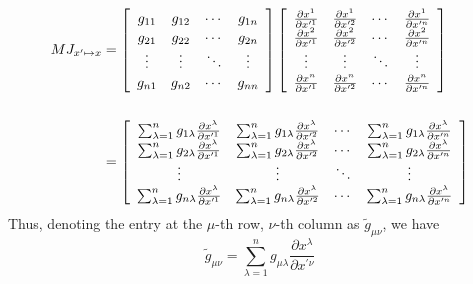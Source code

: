\documentclass{article}
\begin{document}
\begin{align*}
M J_{x' \mapsto x} &=
\left[
\begin{array}{cccc}
g_{11} & g_{12} & \cdots & g_{1n} \vphantom{\frac{\partial x^1}{\partial x^{\prime n}}} \\
g_{21} & g_{22} & \cdots & g_{2n} \vphantom{\frac{\partial x^1}{\partial x^{\prime n}}} \\
\vdots & \vdots & \ddots & \vdots \\
g_{n1} & g_{n2} & \cdots & g_{nn} \vphantom{\frac{\partial x^1}{\partial x^{\prime n}}} \\
\end{array}
\right]
\left[
\begin{array}{cccc}
\frac{\partial x^1}{\partial x^{\prime 1}} & \frac{\partial x^1}{\partial x^{\prime 2}} & \cdots & \frac{\partial x^1}{\partial x^{\prime n}} \\
\frac{\partial x^2}{\partial x^{\prime 1}} & \frac{\partial x^2}{\partial x^{\prime 2}} & \cdots & \frac{\partial x^2}{\partial x^{\prime n}} \\
\vdots & \vdots & \ddots & \vdots \\
\frac{\partial x^n}{\partial x^{\prime 1}} & \frac{\partial x^n}{\partial x^{\prime 2}} & \cdots & \frac{\partial x^n}{\partial x^{\prime n}} \vphantom{\frac{\partial x^1}{\partial x^{\prime n}}} \\
\end{array}
\right] \\\\
&=
\left[
\begin{array}{cccc}
\sum_{\lambda=1}^n g_{1\lambda} \frac{\partial x^\lambda}{\partial x^{\prime 1}} &
\sum_{\lambda=1}^n g_{1\lambda} \frac{\partial x^\lambda}{\partial x^{\prime 2}} &
\cdots &
\sum_{\lambda=1}^n g_{1\lambda} \frac{\partial x^\lambda}{\partial x^{\prime n}} \\
\sum_{\lambda=1}^n g_{2\lambda} \frac{\partial x^\lambda}{\partial x^{\prime 1}} &
\sum_{\lambda=1}^n g_{2\lambda} \frac{\partial x^\lambda}{\partial x^{\prime 2}} &
\cdots &
\sum_{\lambda=1}^n g_{2\lambda} \frac{\partial x^\lambda}{\partial x^{\prime n}} \\
\vdots & \vdots & \ddots & \vdots \\
\sum_{\lambda=1}^n g_{n\lambda} \frac{\partial x^\lambda}{\partial x^{\prime 1}} &
\sum_{\lambda=1}^n g_{n\lambda} \frac{\partial x^\lambda}{\partial x^{\prime 2}} &
\cdots &
\sum_{\lambda=1}^n g_{n\lambda} \frac{\partial x^\lambda}{\partial x^{\prime n}} \\
\end{array}
\right]
\end{align*}
Thus, denoting the entry at the $\mu$-th row, $\nu$-th column as $\tilde{g}_{\mu\nu}$,
we have
\[
\tilde{g}_{\mu\nu} = \sum_{\lambda=1}^n g_{\mu\lambda}
\frac{\partial x^\lambda}{\partial x^{\prime \nu}}
\tag{2}
\]\\
\end{document}
